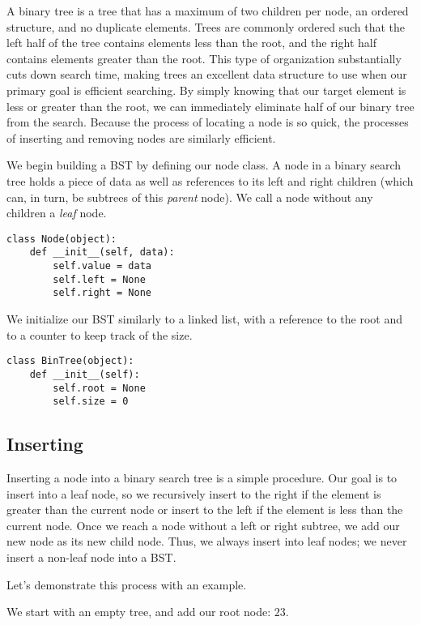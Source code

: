 A binary tree is a tree that has a maximum of two children per node, an ordered structure, and no duplicate elements.
Trees are commonly ordered such that the left half of the tree contains elements less than the root, and the right half contains elements greater than the root.
This type of organization substantially cuts down search time, making trees an excellent data structure to use when our primary goal is efficient searching.
By simply knowing that our target element is less or greater than the root, we can immediately eliminate half of our binary tree from the search.
Because the process of locating a node is so quick, the processes of inserting and removing nodes are similarly efficient.

We begin building a BST by defining our node class. A node in a binary search tree holds a piece of data as well as references to its left and right children (which can, in turn, be subtrees of this \emph{parent} node).
We call a node without any children a \emph{leaf} node.

\begin{lstlisting}
class Node(object):
    def __init__(self, data):
        self.value = data
        self.left = None
        self.right = None
\end{lstlisting}
We initialize our BST similarly to a linked list, with a reference to the root and to a counter to keep track of the size.
\begin{lstlisting}
class BinTree(object):
    def __init__(self):
        self.root = None
        self.size = 0
\end{lstlisting}

\subsection*{Inserting}
Inserting a node into a binary search tree is a simple procedure.
Our goal is to insert into a leaf node, so we recursively insert to the right if the element is greater than the current node or insert to the left if the element is less than the current node.
Once we reach a node without a left or right subtree, we add our new node as its new child node.
Thus, we always insert into leaf nodes; we never insert a non-leaf node into a BST.

Let's demonstrate this process with an example.

\begin{minipage}{0.35\textwidth}
\end{minipage}\hfill
\begin{minipage}{0.55\textwidth}
    We start with an empty tree, and add our root node: $23$.
\end{minipage}

